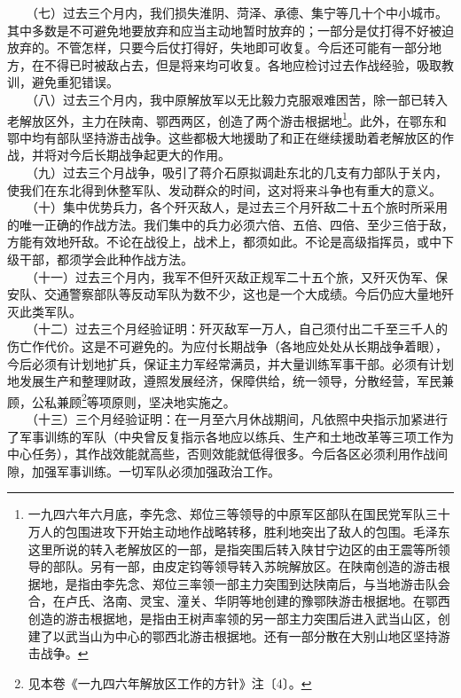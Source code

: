 \documentclass[cn,11pt,chinese]{elegantbook}
\begin{document}
　　（七）过去三个月内，我们损失淮阴、菏泽、承德、集宁等几十个中小城市。其中多数是不可避免地要放弃和应当主动地暂时放弃的；一部分是仗打得不好被迫放弃的。不管怎样，只要今后仗打得好，失地即可收复。今后还可能有一部分地方，在不得已时被敌占去，但是将来均可收复。各地应检讨过去作战经验，吸取教训，避免重犯错误。\\
　　（八）过去三个月内，我中原解放军以无比毅力克服艰难困苦，除一部已转入老解放区外，主力在陕南、鄂西两区，创造了两个游击根据地\footnote[3]{ 一九四六年六月底，李先念、郑位三等领导的中原军区部队在国民党军队三十万人的包围进攻下开始主动地作战略转移，胜利地突出了敌人的包围。毛泽东这里所说的转入老解放区的一部，是指突围后转入陕甘宁边区的由王震等所领导的部队。另有一部，由皮定钧等领导转入苏皖解放区。在陕南创造的游击根据地，是指由李先念、郑位三率领一部主力突围到达陕南后，与当地游击队会合，在卢氏、洛南、灵宝、潼关、华阴等地创建的豫鄂陕游击根据地。在鄂西创造的游击根据地，是指由王树声率领的另一部主力突围后进入武当山区，创建了以武当山为中心的鄂西北游击根据地。还有一部分散在大别山地区坚持游击战争。}。此外，在鄂东和鄂中均有部队坚持游击战争。这些都极大地援助了和正在继续援助着老解放区的作战，并将对今后长期战争起更大的作用。\\
　　（九）过去三个月战争，吸引了蒋介石原拟调赴东北的几支有力部队于关内，使我们在东北得到休整军队、发动群众的时间，这对将来斗争也有重大的意义。\\
　　（十）集中优势兵力，各个歼灭敌人，是过去三个月歼敌二十五个旅时所采用的唯一正确的作战方法。我们集中的兵力必须六倍、五倍、四倍、至少三倍于敌，方能有效地歼敌。不论在战役上，战术上，都须如此。不论是高级指挥员，或中下级干部，都须学会此种作战方法。\\
　　（十一）过去三个月内，我军不但歼灭敌正规军二十五个旅，又歼灭伪军、保安队、交通警察部队等反动军队为数不少，这也是一个大成绩。今后仍应大量地歼灭此类军队。\\
　　（十二）过去三个月经验证明：歼灭敌军一万人，自己须付出二千至三千人的伤亡作代价。这是不可避免的。为应付长期战争（各地应处处从长期战争着眼），今后必须有计划地扩兵，保证主力军经常满员，并大量训练军事干部。必须有计划地发展生产和整理财政，遵照发展经济，保障供给，统一领导，分散经营，军民兼顾，公私兼顾\footnote[4]{ 见本卷《一九四六年解放区工作的方针》注〔4〕。}等项原则，坚决地实施之。\\
　　（十三）三个月经验证明：在一月至六月休战期间，凡依照中央指示加紧进行了军事训练的军队（中央曾反复指示各地应以练兵、生产和土地改革等三项工作为中心任务），其作战效能就高些，否则效能就低得很多。今后各区必须利用作战间隙，加强军事训练。一切军队必须加强政治工作。\\
\end{document}
